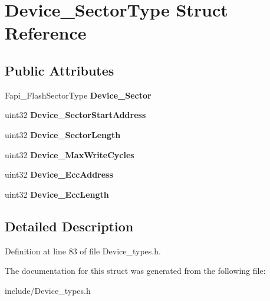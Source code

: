 \hypertarget{structDevice__SectorType}{}\section{Device\+\_\+\+Sector\+Type Struct Reference}
\label{structDevice__SectorType}
\subsection*{Public Attributes}
\begin{DoxyCompactItemize}
\item 
\mbox{\label{structDevice__SectorType_a3348dc841961c6ebce8a4b0f815059fb}} 
Fapi\+\_\+\+Flash\+Sector\+Type {\bfseries Device\+\_\+\+Sector}
\item 
\mbox{\label{structDevice__SectorType_a0565400358dae2701f26b87343ab6397}} 
uint32 {\bfseries Device\+\_\+\+Sector\+Start\+Address}
\item 
\mbox{\label{structDevice__SectorType_aa4ee713709a1cee0f0bbf38574824cc0}} 
uint32 {\bfseries Device\+\_\+\+Sector\+Length}
\item 
\mbox{\label{structDevice__SectorType_a87d965753ffaf9f0e36d8357cdc1ee14}} 
uint32 {\bfseries Device\+\_\+\+Max\+Write\+Cycles}
\item 
\mbox{\label{structDevice__SectorType_ae178d68e175ad3cce3cf7e7172ac55c0}} 
uint32 {\bfseries Device\+\_\+\+Ecc\+Address}
\item 
\mbox{\label{structDevice__SectorType_a5ab9a748c27bc2e88aa3922a0d024beb}} 
uint32 {\bfseries Device\+\_\+\+Ecc\+Length}
\end{DoxyCompactItemize}


\subsection{Detailed Description}


Definition at line 83 of file Device\+\_\+types.\+h.



The documentation for this struct was generated from the following file\+:\begin{DoxyCompactItemize}
\item 
include/Device\+\_\+types.\+h\end{DoxyCompactItemize}
